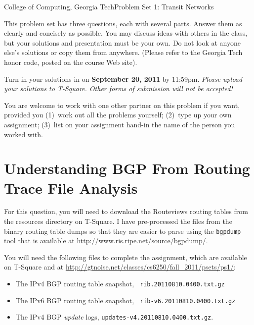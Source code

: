 \documentclass[11pt]{article}
\begin{document}


{College of Computing, Georgia Tech}{Problem Set 1: Transit Networks}


This problem set has three questions, each with several parts.  Answer
them as clearly and concisely as possible.  You may discuss ideas with
others in the class, but your solutions and presentation must be your
own.  Do not look at anyone else's solutions or copy them from
anywhere. (Please refer to the Georgia Tech honor code, posted on the
course Web site).

Turn in your solutions in on {\bf September 20, 2011} by 11:59pm.  {\em
  Please upload your solutions to T-Square.  Other forms of submission
  will not be accepted!}

You are welcome to work with one other partner on this problem if you
want, provided you (1)~work out all the problems yourself; (2)~type up
your own assignment; (3)~list on your assignment hand-in the name of the
person you worked with.

\section{Understanding BGP From Routing Trace File Analysis}

For this question, you will need to download the Routeviews routing
tables from the resources directory on T-Square.  I have pre-processed
the files from the binary routing table dumps so that they are easier to
parse using the {\tt bgpdump} tool that is available at
\url{http://www.ris.ripe.net/source/bgpdump/}.  

You will need the following files to complete the assignment, which are
available on T-Square and at \url{http://gtnoise.net/classes/cs6250/fall_2011/psets/ps1/}:
\begin{itemize}
\itemsep=-1pt
\item The IPv4 BGP routing table snapshot, {\tt
  rib.20110810.0400.txt.gz}
\item The IPv6 BGP routing table snapshot, {\tt
  rib-v6.20110810.0400.txt.gz}
\item The IPv4 BGP {\em update} logs, {\tt updates-v4.20110810.0400.txt.gz}.
\end{itemize}
\end{document}
